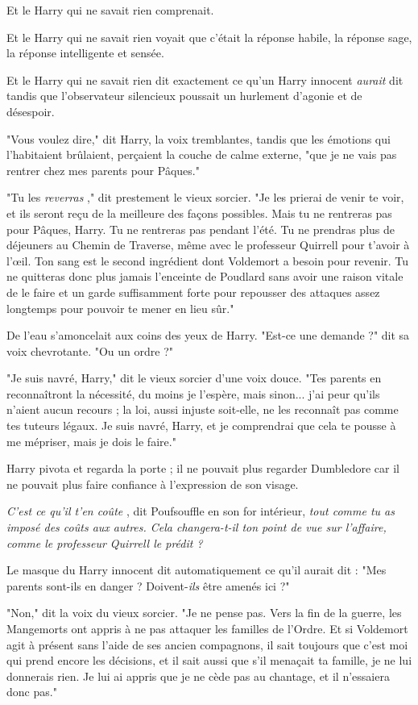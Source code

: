 Et le Harry qui ne savait rien comprenait.

Et le Harry qui ne savait rien voyait que c'était la réponse habile, la réponse sage, la réponse intelligente et sensée.

Et le Harry qui ne savait rien dit exactement ce qu'un Harry innocent \emph{aurait } dit tandis que l'observateur silencieux poussait un hurlement d'agonie et de désespoir.

"Vous voulez dire," dit Harry, la voix tremblantes, tandis que les émotions qui l'habitaient brûlaient, perçaient la couche de calme externe, "que je ne vais pas rentrer chez mes parents pour Pâques."

"Tu les \emph{reverras} ," dit prestement le vieux sorcier. "Je les prierai de venir te voir, et ils seront reçu de la meilleure des façons possibles. Mais tu ne rentreras pas pour Pâques, Harry. Tu ne rentreras pas pendant l'été. Tu ne prendras plus de déjeuners au Chemin de Traverse, même avec le professeur Quirrell pour t'avoir à l'œil. Ton sang est le second ingrédient dont Voldemort a besoin pour revenir. Tu ne quitteras donc plus jamais l'enceinte de Poudlard sans avoir une raison vitale de le faire et un garde suffisamment forte pour repousser des attaques assez longtemps pour pouvoir te mener en lieu sûr."

De l'eau s'amoncelait aux coins des yeux de Harry. "Est-ce une demande ?" dit sa voix chevrotante. "Ou un ordre ?"

"Je suis navré, Harry," dit le vieux sorcier d'une voix douce. "Tes parents en reconnaîtront la nécessité, du moins je l'espère, mais sinon... j'ai peur qu'ils n'aient aucun recours ; la loi, aussi injuste soit-elle, ne les reconnaît pas comme tes tuteurs légaux. Je suis navré, Harry, et je comprendrai que cela te pousse à me mépriser, mais je dois le faire."

Harry pivota et regarda la porte ; il ne pouvait plus regarder Dumbledore car il ne pouvait plus faire confiance à l'expression de son visage.

\emph{C'est ce qu'il t'en coûte} , dit Poufsouffle en son for intérieur, \emph{tout comme tu as imposé des coûts aux autres. Cela changera-t-il ton point de vue sur l'affaire, comme le professeur Quirrell le prédit ?} 

Le masque du Harry innocent dit automatiquement ce qu'il aurait dit : "Mes parents sont-ils en danger ? Doivent-\emph{ils}  être amenés ici ?"

"Non," dit la voix du vieux sorcier. "Je ne pense pas. Vers la fin de la guerre, les Mangemorts ont appris à ne pas attaquer les familles de l'Ordre. Et si Voldemort agit à présent sans l'aide de ses ancien compagnons, il sait toujours que c'est moi qui prend encore les décisions, et il sait aussi que s'il menaçait ta famille, je ne lui donnerais rien. Je lui ai appris que je ne cède pas au chantage, et il n'essaiera donc pas."


